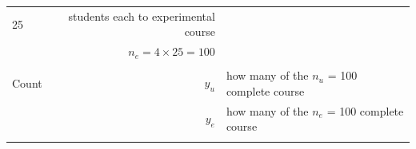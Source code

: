 \documentclass[]{book}
\begin{document}
\begin{longtable}[]{@{}lrl@{}}
\begin{minipage}[t]{0.16\columnwidth}
25\strut
\end{minipage} & \begin{minipage}[t]{0.16\columnwidth}\raggedright
students each to experimental course\strut
\end{minipage}\tabularnewline
\begin{minipage}[t]{0.60\columnwidth}\raggedright
\strut
\end{minipage} & \begin{minipage}[t]{0.16\columnwidth}\raggedleft
\(n_e = 4 \times 25 =100\)\strut
\end{minipage} & \begin{minipage}[t]{0.16\columnwidth}\raggedright
\strut
\end{minipage}\tabularnewline
\begin{minipage}[t]{0.60\columnwidth}\raggedright
\strut
\end{minipage} & \begin{minipage}[t]{0.16\columnwidth}\raggedleft
\strut
\end{minipage} & \begin{minipage}[t]{0.16\columnwidth}\raggedright
\strut
\end{minipage}\tabularnewline
\begin{minipage}[t]{0.60\columnwidth}\raggedright
Count\strut
\end{minipage} & \begin{minipage}[t]{0.16\columnwidth}\raggedleft
\(y_u\)\strut
\end{minipage} & \begin{minipage}[t]{0.16\columnwidth}\raggedright
how many of the \(n_u\) = 100 complete course\strut
\end{minipage}\tabularnewline
\begin{minipage}[t]{0.60\columnwidth}\raggedright
\strut
\end{minipage} & \begin{minipage}[t]{0.16\columnwidth}\raggedleft
\(y_e\)\strut
\end{minipage} & \begin{minipage}[t]{0.16\columnwidth}\raggedright
how many of the \(n_e\) = 100 complete course\strut
\end{minipage}\tabularnewline
\begin{minipage}[t]{0.60\columnwidth}\raggedright
\strut
\end{minipage} & \begin{minipage}[t]{0.16\columnwidth}\raggedleft
\strut
\end{minipage} & \begin{minipage}[t]{0.16\columnwidth}\raggedright

\end{minipage}
\end{longtable}
\end{document}
